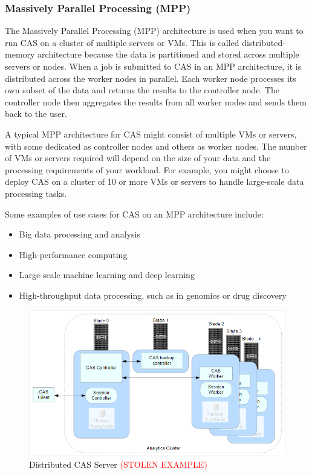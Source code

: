 \subsubsection{Massively Parallel Processing (MPP)}
The Massively Parallel Processing (MPP) architecture is used when you want to run CAS on a cluster of multiple servers or VMs. This is called distributed-memory architecture because the data is partitioned and stored across multiple servers or nodes. When a job is submitted to CAS in an MPP architecture, it is distributed across the worker nodes in parallel. Each worker node processes its own subset of the data and returns the results to the controller node. The controller node then aggregates the results from all worker nodes and sends them back to the user.

A typical MPP architecture for CAS might consist of multiple VMs or servers, with some dedicated as controller nodes and others as worker nodes. The number of VMs or servers required will depend on the size of your data and the processing requirements of your workload. For example, you might choose to deploy CAS on a cluster of 10 or more VMs or servers to handle large-scale data processing tasks.

Some examples of use cases for CAS on an MPP architecture include:
\begin{itemize}
    \item Big data processing and analysis
    \item High-performance computing
    \item Large-scale machine learning and deep learning
    \item High-throughput data processing, such as in genomics or drug discovery
\end{itemize}

\begin{figure}[H]
    \centering
    \includegraphics[scale = 0.70]{images/mpp_server.png}
    \caption{Distributed CAS Server \textcolor{red}{(STOLEN EXAMPLE)} }
    \label{MMP Architecture}
\end{figure}

